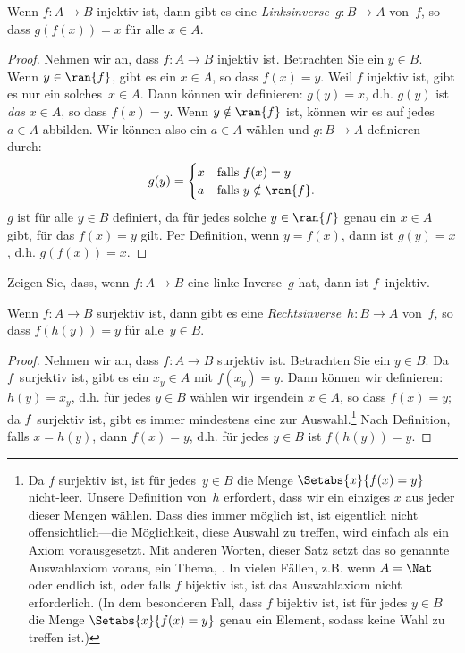\documentclass[../../../include/open-logic-section]{subfiles}
\begin{document}
\begin{prop}
Wenn $f\colon A \to B$ injektiv ist, dann gibt es eine 
\emph{Linksinverse}~$g\colon B \to A$ von~$f$, so dass $g(f(x)) = x$ für alle $x
\in A$.
\end{prop}

\begin{proof}
Nehmen wir an, dass $f\colon A \to B$ injektiv ist. Betrachten Sie ein $y \in B$.
Wenn $y \in \ran{f}$, gibt es ein $x \in A$, so dass $f(x) = y$. Weil
$f$ injektiv ist, gibt es nur ein solches~$x \in A$. Dann können wir
definieren: $g(y) = x$, d.h. $g(y)$ ist \emph{das} $x \in A$, so dass $f(x)
= y$.  Wenn $y \notin \ran{f}$ ist, können wir es auf jedes~$a \in A$ abbilden. Wir können also
ein $a \in A$ wählen und $g \colon B \to A$ definieren durch:
\[
g(y) = \begin{cases}
    x & \text{falls $f(x) = y$}\\
    a & \text{falls $y \notin \ran{f}$.}
\end{cases}
\]
$g$ ist für alle $y \in B$ definiert, da für jedes solche $y \in \ran{f}$
genau ein $x \in A$ gibt, für das $f(x) = y$ gilt. Per Definition, wenn
$y = f(x)$, dann ist $g(y) = x$, d.h. $g(f(x)) = x$.
\end{proof}

\begin{prob}
Zeigen Sie, dass, wenn $f\colon A \to B$ eine linke Inverse~$g$ hat, dann ist $f$~injektiv.
\end{prob}

\begin{prop}
    Wenn $f \colon A \to B$ surjektiv ist, dann gibt es eine
    \emph{Rechtsinverse}~$h\colon B \to A$ von~$f$, so dass $f(h(y)) =
    y$ für alle~$y \in B$.
\end{prop}

\begin{proof}
Nehmen wir an, dass $f\colon A \to B$ surjektiv ist. Betrachten Sie ein $y \in
B$. Da $f$~surjektiv ist, gibt es ein $x_y \in A$ mit $f(x_y)
= y$.  Dann können wir definieren: $h(y) = x_y$, d.h. für jedes $y \in B$ wählen wir
irgendein $x \in A$, so dass $f(x) = y$; da $f$~surjektiv ist,
gibt es immer mindestens eine zur Auswahl.\footnote{Da $f$
surjektiv ist, ist für jedes~$y \in B$ die Menge $\Setabs{x}{f(x) = y}$
nicht-leer. Unsere Definition von~$h$ erfordert, dass wir ein einziges $x$
aus jeder dieser Mengen wählen. Dass dies immer möglich ist, ist eigentlich nicht
offensichtlich---die Möglichkeit, diese Auswahl zu treffen, wird einfach als ein Axiom vorausgesetzt. 
Mit anderen Worten, dieser Satz setzt das so genannte Auswahlaxiom voraus, ein Thema,
. 
In vielen Fällen, z.B. wenn $A = \Nat$ oder endlich ist, oder falls $f$ bijektiv ist,
ist das Auswahlaxiom nicht erforderlich. (In dem besonderen Fall, dass $f$ bijektiv ist,
ist für jedes $y \in B$ die Menge 
$\Setabs{x}{f(x) = y}$ genau ein Element, sodass keine Wahl zu treffen ist.)} 
Nach Definition, falls $x = h(y)$,
dann $f(x) = y$, d.h. für jedes $y \in B$ ist $f(h(y)) = y$.
\end{proof}
\end{document}
